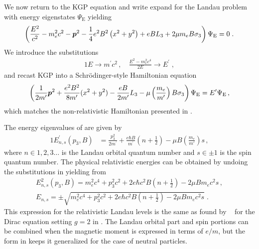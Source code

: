 We now return to the KGP equation and write expand  for the Landau problem with energy eigenstates $\Psi_\mathrm{E}$ yielding
\begin{alignat}{1}
    \label{lan09}
    \left(\frac{E^{2}}{c^{2}}-m_{e}^{2}c^{2}-\boldsymbol{p}^{2}-\frac{1}{4}e^{2}B^{2}\left(x^{2}+y^{2}\right)+eBL_{3}+2\mu m_{e} B\sigma_{3}\right)\Psi_\mathrm{E}=0\;.
\end{alignat} 
We introduce the substitutions 
\begin{alignat}{1}
    \label{lan10}
    E\to m^\prime c^{2}\,,\quad \frac{E^{2}-m_{e}^{2}c^{4}}{2E}\to E^\prime\;,
\end{alignat} 
and recast KGP  into a Schr{\"o}dinger-style Hamiltonian equation
\begin{gather}
	\label{lan11} \left(\frac{1}{2m'}\boldsymbol{p}^{2}+\frac{e^{2}B^{2}}{8m'}(x^{2}+y^{2})-\frac{eB}{2m'}L_{3}-\mu\left(\frac{m_{e}}{m'}\right)B\sigma_{3}\right)\Psi_\mathrm{E}=E'\Psi_\mathrm{E}\,,
\end{gather}
which matches the non-relativistic Hamiltonian presented in .

The energy eigenvalues of  are given by
\begin{alignat}{1}
    \label{lan23}
    E^\prime_{n,s}(p_{3},B)&=\frac{p_{3}^{2}}{2m^\prime }+\frac{e\hbar B}{m^\prime}\left(n+\frac{1}{2}\right)-\mu B\left(\frac{m_{e}}{m'}\right)s\,,
\end{alignat}
where $n\in1,2,3\ldots$ is the Landau orbital quantum number and $s\in\pm1$ is the spin quantum number. The physical relativistic energies can be obtained by undoing the substitutions in  yielding from 
\begin{gather}
\label{lan24}
E^{2}_{n,s}(p_{3},B)=m_{e}^{2}c^{4}+p_{3}^{2}c^{2}+2e\hbar c^{2}B\left(n+\frac{1}{2}\right)-2\mu B m_{e}c^{2}s\,,\\
\label{lan24b}
E_{n,s}=\pm\sqrt{m_{e}^{2}c^{4}+p_{3}^{2}c^{2}+2e\hbar c^{2}B\left(n+\frac{1}{2}\right)-2\mu B m_{e}c^{2}s}\;.
\end{gather}
This expression for the relativistic Landau levels is the same as found by ~\cite{Weisskopf:1936hya} for the Dirac equation setting $g\!=\!2$ in . The Landau orbital part and spin portions can be combined when the magnetic moment is expressed in terms of $e/m$, but the form in  keeps it generalized for the case of neutral particles.


